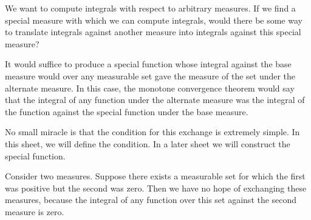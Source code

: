 
\sbasic



































\sstart
{}


We want to compute integrals
with respect to arbitrary measures.
If we find a special measure
with which we can compute integrals,
would there
be some way to translate
integrals against another measure
into integrals against this special
measure?

It would suffice to produce a special function
whose integral against the base measure
would over any measurable set gave
the measure of the set under the alternate
measure.
In this case, the monotone convergence
theorem would say that the integral of
any function under the alternate
measure was the integral of the function
against the special function under the
base measure.

No small miracle is that the condition
for this exchange is extremely simple.
In this sheet, we will define the
condition. In a later sheet we will
construct the special function.


Consider two measures.
Suppose there exists
a measurable set for which the first
was positive but the second was zero.
Then we have no hope of exchanging
these measures, because the integral
of any function over this set against
the second measure is zero.

